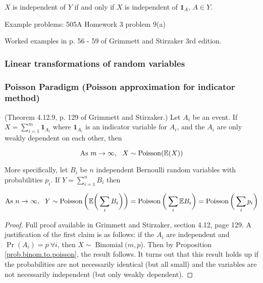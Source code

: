 \begin{theorem} \(X\) is independent of \(Y\) if and only if \(X\) is independent of \(\boldsymbol{1}_A\), \(A \in Y\). \end{theorem}

Example problems: 505A Homework 3 problem 9(a)

Worked examples in p. 56 - 59 of Grimmett and Stirzaker 3rd edition.

\subsubsection{Linear transformations of random variables}

\subsubsection{Poisson Paradigm (Poisson approximation for indicator method)}\label{prob.poisson.paradigm}

\begin{theorem} (Theorem 4.12.9, p. 129 of Grimmett and Stirzaker.) Let \(A_i\) be an event. If \(X = \sum_{i=1}^m \boldsymbol{1}_{A_i}\) where \(\boldsymbol{1}_{A_i}\) is an indicator variable for \(A_i\), and the \(A_i\) are only weakly dependent on each other, then 

\[
\text{As } m \to \infty, \ \ X \sim \operatorname{Poisson}(\E(X))
\]

More specifically, let \(B_i\) be \(n\) independent Bernoulli random variables with probabilities \(p_i\). If \(Y = \sum_{i=1}^n B_i\) then 

\[
\text{As } n \to \infty, \ \ Y \sim \operatorname{Poisson} \bigg(\E \bigg(\sum_i B_i \bigg) \bigg) = \operatorname{Poisson}\bigg(\sum_i \E B_i \bigg) = \operatorname{Poisson}\bigg(\sum_i p_i \bigg) 
\]

\end{theorem}

\begin{proof}
Full proof available in Grimmett and Stirzaker, section 4.12, page 129. A justification of the first claim is as follows: if the \(A_i\) are independent and \(\Pr(A_i) = p \ \forall i\), then \(X \sim \operatorname{Binomial}(m, p\)). Then by Proposition \ref{prob.binom.to.poisson}, the result follows. It turns out that this result holds up if the probabilities are not necessarily identical (but all small) and the variables are not necessarily independent (but only weakly dependent).
\end{proof}

